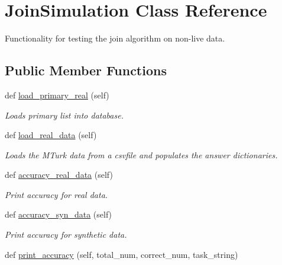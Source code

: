 \hypertarget{classjoinapp_1_1join__simulations_1_1_join_simulation}{}\section{Join\+Simulation Class Reference}
\label{classjoinapp_1_1join__simulations_1_1_join_simulation}


Functionality for testing the join algorithm on non-\/live data.  


\subsection*{Public Member Functions}
\begin{DoxyCompactItemize}
\item 
def \mbox{\hyperlink{classjoinapp_1_1join__simulations_1_1_join_simulation_a4064c1b101ce0d676fc7fb69ace4e255}{load\+\_\+primary\+\_\+real}} (self)
\begin{DoxyCompactList}\small\item\em Loads primary list into database. \end{DoxyCompactList}\item 
def \mbox{\hyperlink{classjoinapp_1_1join__simulations_1_1_join_simulation_a42941bc48b6d192489668af4bc76a48a}{load\+\_\+real\+\_\+data}} (self)
\begin{DoxyCompactList}\small\item\em Loads the M\+Turk data from a csvfile and populates the answer dictionaries. \end{DoxyCompactList}\item 
def \mbox{\hyperlink{classjoinapp_1_1join__simulations_1_1_join_simulation_a687be0f78243c2019ef987b356d469a4}{accuracy\+\_\+real\+\_\+data}} (self)
\begin{DoxyCompactList}\small\item\em Print accuracy for real data. \end{DoxyCompactList}\item 
def \mbox{\hyperlink{classjoinapp_1_1join__simulations_1_1_join_simulation_a11bfabcf4e2a1974fa48acb97e3055e7}{accuracy\+\_\+syn\+\_\+data}} (self)
\begin{DoxyCompactList}\small\item\em Print accuracy for synthetic data. \end{DoxyCompactList}\item 
def \mbox{\hyperlink{classjoinapp_1_1join__simulations_1_1_join_simulation_a404c07ff16d9858a763691b7796b4c45}{print\+\_\+accuracy}} (self, total\+\_\+num, correct\+\_\+num, task\+\_\+string)

\end{DoxyCompactItemize}
